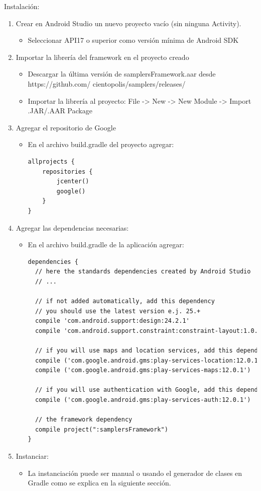 Instalación:
\begin{enumerate}
	\item Crear en Android Studio un nuevo proyecto vacío (sin ninguna Activity).
		\begin{itemize}
		\item Seleccionar API17 o superior como versión mínima de Android SDK
		\end{itemize}
	\item Importar la librería del framework en el proyecto creado
		\begin{itemize}
		\item Descargar la última versión de samplersFramework.aar desde https://github.com/			cientopolis/samplers/releases/
		\item Importar la librería al proyecto: File -> New -> New Module -> Import .JAR/.AAR Package
		\end{itemize}
	\item Agregar el repositorio de Google
		\begin{itemize}
			\item En el archivo build.gradle del proyecto agregar: 
			\begin{lstlisting}[language=XML, frame=single]
allprojects {
    repositories {
        jcenter()
        google()
    }
}
			\end{lstlisting}	
		\end{itemize}
	\item Agregar las dependencias necesarias:
		\begin{itemize}
			\item En el archivo build.gradle de la aplicación agregar: 
			\begin{lstlisting}[language=XML, frame=tlb]
dependencies {
  // here the standards dependencies created by Android Studio
  // ...

  // if not added automatically, add this dependency 
  // you should use the latest version e.j. 25.+
  compile 'com.android.support:design:24.2.1' 
  compile 'com.android.support.constraint:constraint-layout:1.0.2'

  // if you will use maps and location services, add this dependencies (you should use the latest version)
  compile ('com.google.android.gms:play-services-location:12.0.1')
  compile ('com.google.android.gms:play-services-maps:12.0.1')
  
  // if you will use authentication with Google, add this dependencies (you should use the latest version)
  compile ('com.google.android.gms:play-services-auth:12.0.1')

  // the framework dependency
  compile project(":samplersFramework")
}
			\end{lstlisting}	
		\end{itemize}	

	\item Instanciar:
		\begin{itemize}
		\item La instanciación puede ser manual o usando el generador de clases en Gradle como se explica en la siguiente sección.
		\end{itemize}
\end{enumerate}	

